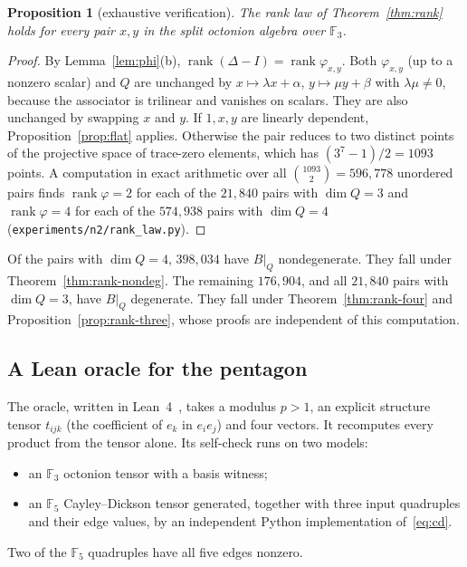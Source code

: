 \documentclass[11pt]{amsart}
\newtheorem{proposition}[theorem]{Proposition}
\theoremstyle{definition}
\theoremstyle{remark}
\newcommand{\F}{\mathbb{F}}
\newcommand{\C}{\mathcal{C}}
\DeclareMathOperator{\rank}{rank}
\begin{document}
\begin{proposition}[exhaustive verification]\label{prop:f3}
The rank law of Theorem~\ref{thm:rank} holds for every pair $x,y$ in the split octonion
algebra over $\F_3$.
\end{proposition}

\begin{proof}
By Lemma~\ref{lem:phi}(b), $\rank(\Delta-I)=\rank\varphi_{x,y}$. Both $\varphi_{x,y}$ (up to a nonzero
scalar) and $Q$ are unchanged by $x\mapsto\lambda x+\alpha$,
$y\mapsto\mu y+\beta$ with $\lambda\mu\neq0$, because the associator is
trilinear and vanishes on scalars. They are also unchanged by swapping $x$ and
$y$. If $1,x,y$ are linearly dependent, Proposition~\ref{prop:flat} applies.
Otherwise the pair reduces to two distinct points of the projective space of
trace-zero elements, which has $(3^7-1)/2=1093$ points. A computation in exact
arithmetic over all $\binom{1093}{2}=596{,}778$ unordered pairs finds
$\rank\varphi=2$ for each of the $21{,}840$ pairs with $\dim Q=3$ and
$\rank\varphi=4$ for each of the $574{,}938$ pairs with $\dim Q=4$
(\texttt{experiments/n2/rank\_law.py}).
\end{proof}

Of the pairs with $\dim Q=4$, $398{,}034$ have $B|_Q$ nondegenerate. They fall
under Theorem~\ref{thm:rank-nondeg}. The remaining $176{,}904$, and all
$21{,}840$ pairs with $\dim Q=3$, have $B|_Q$ degenerate. They fall under
Theorem~\ref{thm:rank-four} and Proposition~\ref{prop:rank-three}, whose
proofs are independent of this computation.

\begin{table}[t]
\centering
\small

\caption{Defect census over $\C_\ell$: number of pairs in each stratum
$(\dim Q,\rank(\Delta-I))$, number of distinct traces on the $\dim Q=4$
stratum, and the total number of failed checks. Generated from
\texttt{data/n2/defect-census-v1.json}.}
\label{tab:census}
\end{table}

\subsection{A Lean oracle for the pentagon}
The oracle, written in Lean~4~\cite{moura2021}, takes a modulus
$p>1$, an explicit structure tensor $t_{ijk}$ (the coefficient of $e_k$ in
$e_ie_j$) and four vectors. It recomputes every product from the tensor
alone. Its self-check runs on two models:
\begin{itemize}
\item an $\F_3$ octonion tensor with a basis witness;
\item an $\F_5$ Cayley--Dickson tensor generated, together with three input
  quadruples and their edge values, by an independent Python implementation
  of~\eqref{eq:cd}.
\end{itemize}
Two of the $\F_5$ quadruples have all five edges nonzero.
\end{document}
